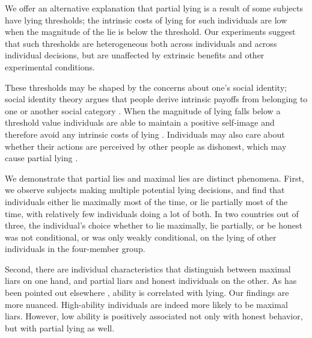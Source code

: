 \documentclass[12pt]{article}
\begin{document}
\par We offer an alternative explanation that partial lying is a result of some subjects have lying thresholds; the intrinsic costs of lying for such individuals are low when the magnitude of the lie is below the threshold. Our experiments suggest that such thresholds are heterogeneous both across individuals and across individual decisions, but are unaffected by extrinsic benefits and other experimental conditions.\footnotemark{}

\par These thresholds may be shaped by the concerns about one's social identity; social identity theory argues that people derive intrinsic payoffs from belonging to one or another social category \citep{akerlof2000economics,benabou2011identity}. When the magnitude of lying falls below a threshold value individuals are able to maintain a positive self-image and therefore avoid any intrinsic costs of lying \cite{GinoAriely2016}. Individuals may also care about whether their actions are perceived by other people as dishonest, which may cause partial lying \citep{gneezy2018lying}.  

\par We demonstrate that partial lies and maximal lies are distinct phenomena. First, we observe subjects making multiple potential lying decisions, and find that individuals either lie maximally most of the time, or lie partially most of the time, with relatively few individuals doing a lot of both. In two countries out of three, the individual's choice whether to lie maximally, lie partially, or be honest was not conditional, or was only weakly conditional, on the lying of other individuals in the four-member group.  

\par Second, there are individual characteristics that distinguish between maximal liars on one hand, and partial liars and honest individuals on the other. As has been pointed out elsewhere \citep{DuchSolaz2017}, ability is correlated with lying. Our findings are more nuanced. High-ability individuals are indeed more likely to be maximal liars. However, low ability is positively associated not only with honest behavior, but with partial lying as well. 
\end{document}
